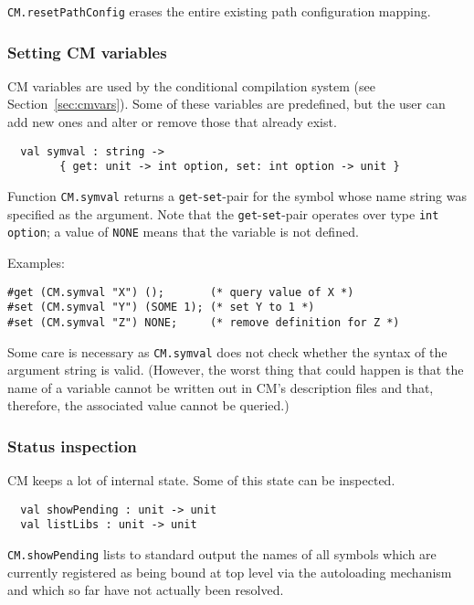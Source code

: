 \documentclass{article}
\begin{document}
{\tt CM.resetPathConfig} erases the entire existing path configuration
mapping.

\subsubsection*{Setting CM variables}

CM variables are used by the conditional compilation system (see
Section~\ref{sec:cmvars}).   Some of these variables are predefined,
but the user can add new ones and alter or remove those that already
exist.

\begin{verbatim}
  val symval : string ->
        { get: unit -> int option, set: int option -> unit }
\end{verbatim}

Function {\tt CM.symval} returns a {\tt get}-{\tt set}-pair for the
symbol whose name string was specified as the argument.  Note that the
{\tt get}-{\tt set}-pair operates over type {\tt int option}; a value
of {\tt NONE} means that the variable is not defined.

\noindent Examples:
\begin{verbatim}
#get (CM.symval "X") ();       (* query value of X *)
#set (CM.symval "Y") (SOME 1); (* set Y to 1 *)
#set (CM.symval "Z") NONE;     (* remove definition for Z *)
\end{verbatim}

Some care is necessary as {\tt CM.symval} does not check whether the
syntax of the argument string is valid.  (However, the worst thing
that could happen is that the name of a variable cannot be written out
in CM's description files and that, therefore, the associated value
cannot be queried.)

\subsubsection*{Status inspection}

CM keeps a lot of internal state.  Some of this state can be inspected.

\begin{verbatim}
  val showPending : unit -> unit
  val listLibs : unit -> unit
\end{verbatim}

{\tt CM.showPending} lists to standard output the names of all symbols
which are currently registered as being bound at top level via the
autoloading mechanism and which so far have not actually been
resolved.
\end{document}
